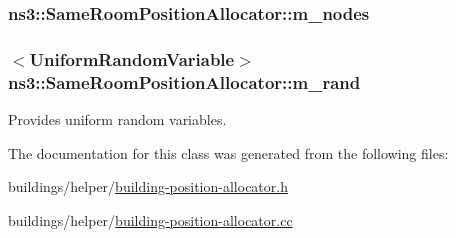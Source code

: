 \subsubsection[{\texorpdfstring{m\+\_\+nodes}{m_nodes}}]{ ns3\+::\+Same\+Room\+Position\+Allocator\+::m\+\_\+nodes\hspace{0.3cm}{\ttfamily [private]}}\hypertarget{classns3_1_1SameRoomPositionAllocator_a3b63686fa8357f8000d82b60d70cf8ef}{}\label{classns3_1_1SameRoomPositionAllocator_a3b63686fa8357f8000d82b60d70cf8ef}
\subsubsection[{\texorpdfstring{m\+\_\+rand}{m_rand}}]{$<${\bf Uniform\+Random\+Variable}$>$ ns3\+::\+Same\+Room\+Position\+Allocator\+::m\+\_\+rand\hspace{0.3cm}{\ttfamily [private]}}\hypertarget{classns3_1_1SameRoomPositionAllocator_a4aba0af39b8d1e6218271bc5d09b4ba2}{}\label{classns3_1_1SameRoomPositionAllocator_a4aba0af39b8d1e6218271bc5d09b4ba2}


Provides uniform random variables. 



The documentation for this class was generated from the following files\+:\begin{DoxyCompactItemize}
\item 
buildings/helper/\hyperlink{building-position-allocator_8h}{building-\/position-\/allocator.\+h}\item 
buildings/helper/\hyperlink{building-position-allocator_8cc}{building-\/position-\/allocator.\+cc}\end{DoxyCompactItemize}

